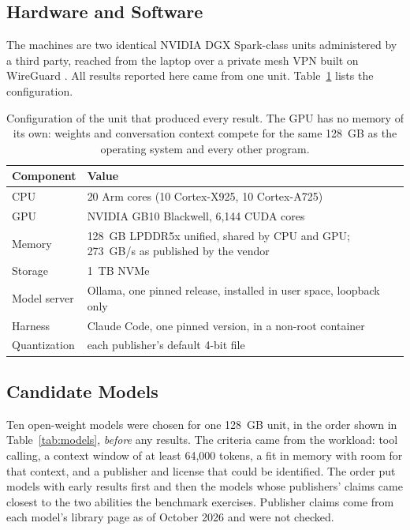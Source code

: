\subsection{Hardware and Software}

The machines are two identical NVIDIA DGX Spark-class units administered by a third party, reached from the laptop over a private mesh VPN built on WireGuard \cite{donenfeld2017wireguard, pennarun2020tailscale}. All results reported here came from one unit. Table~\ref{tab:hardware} lists the configuration.

\begin{table}[htbp]
\centering
\small
\begin{tabular}{@{}lp{12cm}@{}}
\toprule
\textbf{Component} & \textbf{Value} \\
\midrule
CPU & 20 Arm cores (10 Cortex-X925, 10 Cortex-A725) \\
GPU & NVIDIA GB10 Blackwell, 6,144 CUDA cores \\
Memory & 128~GB LPDDR5x unified, shared by CPU and GPU; 273~GB/s as published by the vendor \cite{nvidia2025dgxspark} \\
Storage & 1~TB NVMe \\
Model server & Ollama, one pinned release, installed in user space, loopback only \\
Harness & Claude Code, one pinned version, in a non-root container \\
Quantization & each publisher's default 4-bit file \\
\bottomrule
\end{tabular}
\caption{Configuration of the unit that produced every result. The GPU has no memory of its own: weights and conversation context compete for the same 128~GB as the operating system and every other program.}
\label{tab:hardware}
\end{table}

\subsection{Candidate Models}

Ten open-weight models were chosen for one 128~GB unit, in the order shown in Table~\ref{tab:models}, \textit{before} any results. The criteria came from the workload: tool calling, a context window of at least 64,000 tokens, a fit in memory with room for that context, and a publisher and license that could be identified. The order put models with early results first and then the models whose publishers' claims came closest to the two abilities the benchmark exercises. Publisher claims come from each model's library page as of October 2026 and were not checked.

